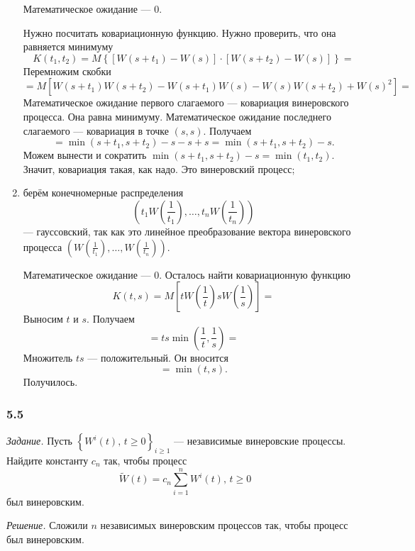 \begin{enumerate}[label=\alph*)]
  Математическое ожидание --- 0.

  Нужно посчитать ковариационную функцию.
  Нужно проверить, что она равняется минимуму
  $$K \left( t_1, t_2 \right) =
    M \left\{
      \left[ W \left( s + t_1 \right) - W \left( s \right) \right] \cdot
      \left[ W \left( s + t_2 \right) - W \left( s \right) \right] \right\} =$$
  Перемножим скобки
  $$= M \left[
      W \left( s + t_1 \right) W \left( s + t_2 \right) -
      W \left( s + t_1 \right) W \left( s \right) - W \left( s \right) W \left( s + t_2 \right) +
      W \left( s \right)^2 \right] =$$
  Математическое ожидание первого слагаемого --- ковариация винеровского процесса.
  Она равна минимуму.
  Математическое ожидание последнего слагаемого --- ковариация в точке $ \left( s, s \right) $.
  Получаем
  $$= \min \left( s + t_1, s + t_2 \right) - s - s + s =
    \min \left( s + t_1, s + t_2 \right) - s.$$
  Можем вынести и сократить
  $\min \left( s + t_1, s + t_2 \right) - s =
    \min \left( t_1, t_2 \right) $.
  Значит, ковариация такая, как надо.
  Это винеровский процесс;
  \item берём конечномерные распределения
  $$ \left(
      t_1 W \left( \frac{1}{t_1} \right), \dotsc, t_n W \left( \frac{1}{t_n} \right)
    \right) $$
  --- гауссовский, так как это линейное преобразование вектора винеровского процесса
  $ \left( W \left( \frac{1}{t_1} \right), \dotsc, W \left( \frac{1}{t_n} \right) \right) $.

  Математическое ожидание --- 0.
  Осталось найти ковариационную функцию
  $$K \left( t, s \right) =
    M \left[ tW \left( \frac{1}{t} \right) sW \left( \frac{1}{s} \right) \right] =$$
  Выносим $t$ и $s$.
  Получаем
  $$= ts \min \left( \frac{1}{t}, \frac{1}{s} \right) =$$
  Множитель $ts$ --- положительный.
  Он вносится
  $$= \min \left( t, s \right).$$
  Получилось.
\end{enumerate}

\subsubsection*{5.5}

\textit{Задание.}
Пусть $ \left\{ W^i \left( t \right), \, t \geq 0 \right\}_{i \geq 1}$ ---
независимые винеровские процессы.
Найдите константу $c_n$ так, чтобы процесс
$$ \tilde{W} \left( t \right) =
  c_n \sum \limits_{i = 1}^n W^i \left( t \right), \,
  t \geq 0$$
был винеровским.

\textit{Решение.}
Сложили $n$ независимых винеровским процессов так, чтобы процесс был винеровским.

